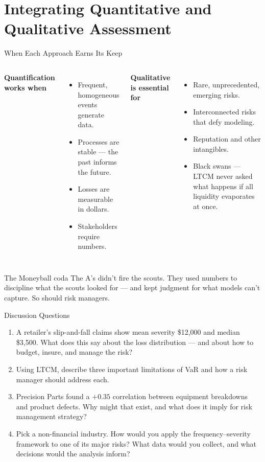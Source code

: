 \documentclass[11pt, aspectratio=169]{beamer}
\begin{document}
\section{Integrating Quantitative and Qualitative Assessment}

\begin{frame}{When Each Approach Earns Its Keep}
\begin{columns}[T]
\textbf{Quantification works when}
\begin{itemize}
  \item Frequent, homogeneous events generate data.
  \item Processes are stable --- the past informs the future.
  \item Losses are measurable in dollars.
  \item Stakeholders require numbers.
\end{itemize}
\textbf{Qualitative is essential for}
\begin{itemize}
  \item Rare, unprecedented, emerging risks.
  \item Interconnected risks that defy modeling.
  \item Reputation and other intangibles.
  \item \alert{Black swans} --- LTCM never asked what happens if all liquidity evaporates at once.
\end{itemize}
\end{columns}
\medskip
\begin{block}{The Moneyball coda}
The A's didn't fire the scouts. They used numbers to discipline what the scouts looked for --- and kept judgment for what models can't capture. So should risk managers.
\end{block}
\end{frame}

\begin{frame}{Discussion Questions}
\begin{enumerate}
  \item A retailer's slip-and-fall claims show mean severity \$12{,}000 and median \$3{,}500. What does this say about the loss distribution --- and about how to budget, insure, and manage the risk?
  \item Using LTCM, describe three important limitations of VaR and how a risk manager should address each.
  \item Precision Parts found a $+0.35$ correlation between equipment breakdowns and product defects. Why might that exist, and what does it imply for risk management strategy?
  \item Pick a non-financial industry. How would you apply the frequency--severity framework to one of its major risks? What data would you collect, and what decisions would the analysis inform?
\end{enumerate}
\end{frame}
\end{document}
